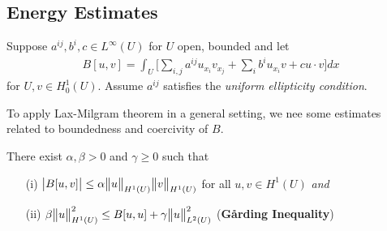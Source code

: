 \documentclass[12pt,a4paper]{report}
\begin{document}
\subsection*{Energy Estimates}

Suppose $a^{ij}, b^i, c \in L^{\infty}(U)$ for $U$ open, bounded and let
\begin{align*}
B[u,v] = \int_U \Big[ \sum_{i,j} a^{ij}u_{x_i}v_{x_j} + \sum_i b^i u_{x_i} v + cu\cdot v \Big] dx
\end{align*}
for $U,v\in H_0^1 (U)$. Assume $a^{ij}$ satisfies the \emph{uniform ellipticity condition}.
\s

To apply Lax-Milgram theorem in a general setting, we nee some estimates related to boundedness and coercivity of $B$. 
\s

\thm There exist $\alpha, \beta >0$ and $\gamma \geq 0$ such that
\begin{itemize}
\item[(i)] $\big| B[u,v]\big| \leq \alpha \bigl\lVert u\bigr\rVert_{H^1(U)} \bigl\lVert v\bigr\rVert_{H^1(U)}$ for all $u,v\in H^1(U)$ \quad \emph{and}
\item[(ii)] $\beta \bigl\lVert u\bigr\rVert_{H^1(U)}^2 \leq B[u,u] + \gamma \bigl\lVert u\bigr\rVert_{L^2(U)}^2$ (\textbf{G{\aa}rding Inequality})
\end{itemize}
\end{document}
